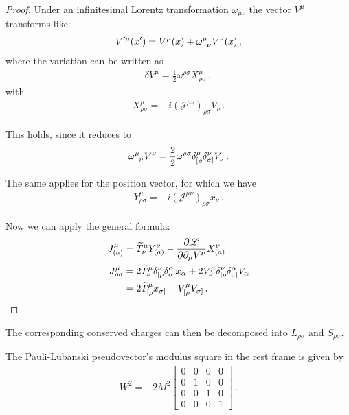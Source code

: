 \documentclass[main.tex]{subfiles}
\begin{document}
\begin{proof}
Under an infinitesimal Lorentz transformation \(\omega_{\mu \nu }\) the vector \(V^{\mu } \) transforms like: 
%
\begin{align}
V^{\prime \mu }(x') = V^{\mu } (x) + \tensor{\omega }{^{\mu }_{\nu }} V^{\nu }(x)
\,,
\end{align}
%
where the variation can be written as 
%
\begin{align}
\delta V^{\mu } = \frac{1}{2} \omega^{\rho \sigma } X^{\mu }_{\rho \sigma }
\,,
\end{align}
%
with 
%
\begin{align}
X^{\mu }_{\rho \sigma } = -i (\mathscr{J}^{\mu \nu })_{\rho \sigma } V_{\nu }
\,.
\end{align}

This holds, since it reduces to 
%
\begin{align}
\tensor{\omega }{^{\mu }_{\nu }} V^{\nu } = \frac{2}{2} \omega^{\rho \sigma } \delta^{\mu }_{[\rho } \delta^{\nu }_{\sigma ]} V_{\nu }
\,.
\end{align}

The same applies for the position vector, for which we have 
%
\begin{align}
Y^{\mu }_{\rho \sigma } = -i (\mathscr{J}^{\mu \nu })_{ \rho \sigma } x_{\nu }
\,.
\end{align}

Now we can apply the general formula: 
%
\begin{subequations}
\begin{align}
J^{\mu }_{(a)} &= \widetilde{T}^{\mu }_{\nu } Y^{\nu }_{(a)} - \pdv{\mathscr{L}}{\partial_{\mu } V^{\nu }} X_{(a)}^{\nu }  \\
J^{\mu }_{\rho \sigma }&= 2\widetilde{T}^{\mu }_{\nu  } \delta^{\nu  }_{[\rho  } \delta^{\alpha }_{\sigma ]} x_{\alpha } 
+ 2 V^{\mu}_{\nu } \delta^{\nu}_{[\rho } \delta^{\alpha }_{\sigma ]} V_{\alpha }  \\
&= 2\widetilde{T}^{\mu }_{[\rho } x_{\sigma ]}
+ V^{\mu }_{[\rho } V_{\sigma ]}
\,.
\end{align}
\end{subequations}
\end{proof}

The corresponding conserved charges can then be decomposed into \(L_{\rho \sigma } \) and \(S_{\rho \sigma }\). 

\begin{claim}
The Pauli-Lubanski pseudovector's modulus square in the rest frame is given by 
%
\begin{subequations}
\begin{align}
W^2 = -2 M^2 \left[\begin{array}{cccc}
0 & 0 & 0 & 0 \\ 
0 & 1 & 0 & 0 \\ 
0 & 0 & 1 & 0 \\ 
0 & 0 & 0 & 1
\end{array}\right]
\,.
\end{align}
\end{subequations}
\end{claim}
\end{document}
